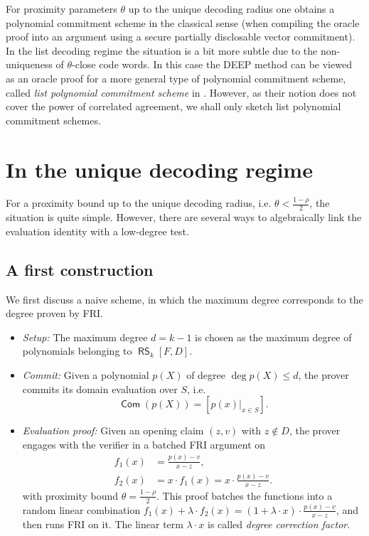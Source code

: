 \documentclass[11pt,article,oneside]{memoir}
\theoremstyle{definition}
\theoremstyle{remark}
\DeclareMathOperator{\comm}{\mathsf{Com}}
\DeclareMathOperator{\RS}{\mathsf{RS}}
\begin{document}
For proximity parameters $\theta$ up to the unique decoding radius one obtains a polynomial commitment scheme in the classical sense (when compiling the oracle proof into an argument using a secure partially disclosable vector commitment). 
In the list decoding regime the situation is a bit more subtle due to the non-uniqueness of $\theta$-close code words. 
In this case the DEEP method can be viewed as an oracle proof for a more general type of polynomial commitment scheme, called \textit{list polynomial commitment scheme} in \cite{Redshift}. 
However, as their notion does not cover the power of correlated agreement, we shall only sketch list polynomial commitment schemes.%

\section{In the unique decoding regime}
For a proximity bound up to the unique decoding radius, i.e. $\theta < \frac{1-\rho}{2}$, the situation is quite simple. 
However, there are several ways to algebraically link the evaluation identity with a low-degree test. 

\subsection{A first construction}
\label{s:naivePC}

We first discuss a naive scheme, in which the maximum degree corresponds to the degree proven by FRI.
\begin{itemize}
\item 
\textit{Setup:}
The maximum degree $d=k-1$ is chosen as the maximum degree of polynomials belonging to $\RS_k[F,D]$.

\item
\textit{Commit:} 
Given a polynomial $p(X)$ of degree $\deg p(X)\leq d$, the prover commits its domain evaluation over $S$, i.e. 
\[
\comm(p(X))= [p(x)|_{x\in S}].
\]

\item
\textit{Evaluation proof: }
Given an opening claim $(z,v)$ with $z\notin D$, the prover engages with the verifier in a batched FRI argument on
\begin{align*}
f_1(x) &= \frac{p(x)-v}{x-z},
\\
f_2(x) &=x\cdot f_1(x)= x\cdot \frac{p(x)-v}{x-z}.
\end{align*}
with proximity bound $\theta = \frac{1-\rho}{2}$. 
This proof batches the functions into a random linear combination $f_1(x)+ \lambda\cdot f_2(x) =(1+\lambda \cdot x)\cdot \frac{p(x)-v}{x-z}$, and then runs FRI on it. 
The linear term $\lambda \cdot x$ is called \textit{degree correction factor}.
\end{itemize}
\end{document}

